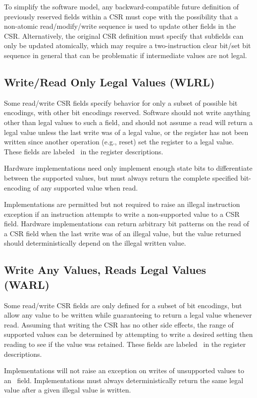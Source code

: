 \begin{commentary}
To simplify the software model, any backward-compatible future
definition of previously reserved fields within a CSR must cope with
the possibility that a non-atomic read/modify/write sequence is used
to update other fields in the CSR.  Alternatively, the original CSR
definition must specify that subfields can only be updated atomically,
which may require a two-instruction clear bit/set bit sequence in
general that can be problematic if intermediate values are not legal.
\end{commentary}

\subsection*{Write/Read Only Legal Values (WLRL)}

Some read/write CSR fields specify behavior for only a subset of
possible bit encodings, with other bit encodings reserved.  Software
should not write anything other than legal values to such a field, and
should not assume a read will return a legal value unless the last
write was of a legal value, or the register has not been written since
another operation (e.g., reset) set the register to a legal value.
These fields are labeled \wlrl\ in the register descriptions.
 
\begin{commentary}
Hardware implementations need only implement enough state bits to
differentiate between the supported values, but must always return the
complete specified bit-encoding of any supported value when read.
\end{commentary}

Implementations are permitted but not required to raise an illegal
instruction exception if an instruction attempts to write a
non-supported value to a CSR field.  Hardware implementations can
return arbitrary bit patterns on the read of a CSR field when the last
write was of an illegal value, but the value returned should
deterministically depend on the illegal written value.

\subsection*{Write Any Values, Reads Legal Values (WARL)}

Some read/write CSR fields are only defined for a subset of bit
encodings, but allow any value to be written while guaranteeing to
return a legal value whenever read.  Assuming that writing the CSR has
no other side effects, the range of supported values can be determined
by attempting to write a desired setting then reading to see if the
value was retained.  These fields are labeled \warl\ in the register
descriptions.

Implementations will not raise an exception on writes of unsupported
values to an \warl\ field.  Implementations must always
deterministically return the same legal value after a given illegal
value is written.


